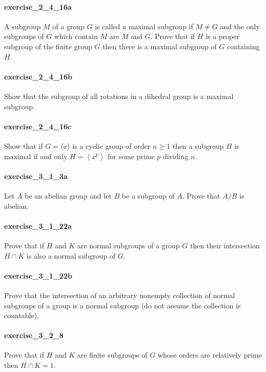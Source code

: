 \documentclass{article}
\begin{document}
\paragraph{exercise\_2\_4\_16a} A subgroup $M$ of a group $G$ is called a maximal subgroup if $M \neq G$ and the only subgroups of $G$ which contain $M$ are $M$ and $G$. Prove that if $H$ is a proper subgroup of the finite group $G$ then there is a maximal subgroup of $G$ containing $H$.

\paragraph{exercise\_2\_4\_16b} Show that the subgroup of all rotations in a dihedral group is a maximal subgroup.

\paragraph{exercise\_2\_4\_16c} Show that if $G=\langle x\rangle$ is a cyclic group of order $n \geq 1$ then a subgroup $H$ is maximal if and only $H=\left\langle x^{p}\right\rangle$ for some prime $p$ dividing $n$.

\paragraph{exercise\_3\_1\_3a} Let $A$ be an abelian group and let $B$ be a subgroup of $A$. Prove that $A / B$ is abelian.

\paragraph{exercise\_3\_1\_22a} Prove that if $H$ and $K$ are normal subgroups of a group $G$ then their intersection $H \cap K$ is also a normal subgroup of $G$.

\paragraph{exercise\_3\_1\_22b} Prove that the intersection of an arbitrary nonempty collection of normal subgroups of a group is a normal subgroup (do not assume the collection is countable).

\paragraph{exercise\_3\_2\_8} Prove that if $H$ and $K$ are finite subgroups of $G$ whose orders are relatively prime then $H \cap K=1$.
\end{document}
